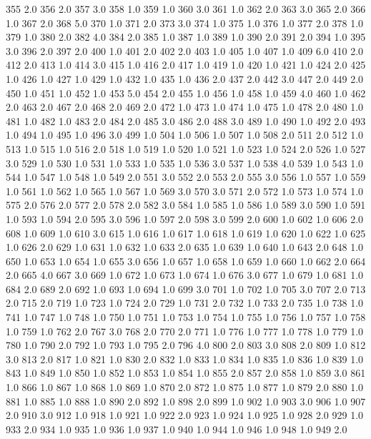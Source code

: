 355	2.0
356	2.0
357	3.0
358	1.0
359	1.0
360	3.0
361	1.0
362	2.0
363	3.0
365	2.0
366	1.0
367	2.0
368	5.0
370	1.0
371	2.0
373	3.0
374	1.0
375	1.0
376	1.0
377	2.0
378	1.0
379	1.0
380	2.0
382	4.0
384	2.0
385	1.0
387	1.0
389	1.0
390	2.0
391	2.0
394	1.0
395	3.0
396	2.0
397	2.0
400	1.0
401	2.0
402	2.0
403	1.0
405	1.0
407	1.0
409	6.0
410	2.0
412	2.0
413	1.0
414	3.0
415	1.0
416	2.0
417	1.0
419	1.0
420	1.0
421	1.0
424	2.0
425	1.0
426	1.0
427	1.0
429	1.0
432	1.0
435	1.0
436	2.0
437	2.0
442	3.0
447	2.0
449	2.0
450	1.0
451	1.0
452	1.0
453	5.0
454	2.0
455	1.0
456	1.0
458	1.0
459	4.0
460	1.0
462	2.0
463	2.0
467	2.0
468	2.0
469	2.0
472	1.0
473	1.0
474	1.0
475	1.0
478	2.0
480	1.0
481	1.0
482	1.0
483	2.0
484	2.0
485	3.0
486	2.0
488	3.0
489	1.0
490	1.0
492	2.0
493	1.0
494	1.0
495	1.0
496	3.0
499	1.0
504	1.0
506	1.0
507	1.0
508	2.0
511	2.0
512	1.0
513	1.0
515	1.0
516	2.0
518	1.0
519	1.0
520	1.0
521	1.0
523	1.0
524	2.0
526	1.0
527	3.0
529	1.0
530	1.0
531	1.0
533	1.0
535	1.0
536	3.0
537	1.0
538	4.0
539	1.0
543	1.0
544	1.0
547	1.0
548	1.0
549	2.0
551	3.0
552	2.0
553	2.0
555	3.0
556	1.0
557	1.0
559	1.0
561	1.0
562	1.0
565	1.0
567	1.0
569	3.0
570	3.0
571	2.0
572	1.0
573	1.0
574	1.0
575	2.0
576	2.0
577	2.0
578	2.0
582	3.0
584	1.0
585	1.0
586	1.0
589	3.0
590	1.0
591	1.0
593	1.0
594	2.0
595	3.0
596	1.0
597	2.0
598	3.0
599	2.0
600	1.0
602	1.0
606	2.0
608	1.0
609	1.0
610	3.0
615	1.0
616	1.0
617	1.0
618	1.0
619	1.0
620	1.0
622	1.0
625	1.0
626	2.0
629	1.0
631	1.0
632	1.0
633	2.0
635	1.0
639	1.0
640	1.0
643	2.0
648	1.0
650	1.0
653	1.0
654	1.0
655	3.0
656	1.0
657	1.0
658	1.0
659	1.0
660	1.0
662	2.0
664	2.0
665	4.0
667	3.0
669	1.0
672	1.0
673	1.0
674	1.0
676	3.0
677	1.0
679	1.0
681	1.0
684	2.0
689	2.0
692	1.0
693	1.0
694	1.0
699	3.0
701	1.0
702	1.0
705	3.0
707	2.0
713	2.0
715	2.0
719	1.0
723	1.0
724	2.0
729	1.0
731	2.0
732	1.0
733	2.0
735	1.0
738	1.0
741	1.0
747	1.0
748	1.0
750	1.0
751	1.0
753	1.0
754	1.0
755	1.0
756	1.0
757	1.0
758	1.0
759	1.0
762	2.0
767	3.0
768	2.0
770	2.0
771	1.0
776	1.0
777	1.0
778	1.0
779	1.0
780	1.0
790	2.0
792	1.0
793	1.0
795	2.0
796	4.0
800	2.0
803	3.0
808	2.0
809	1.0
812	3.0
813	2.0
817	1.0
821	1.0
830	2.0
832	1.0
833	1.0
834	1.0
835	1.0
836	1.0
839	1.0
843	1.0
849	1.0
850	1.0
852	1.0
853	1.0
854	1.0
855	2.0
857	2.0
858	1.0
859	3.0
861	1.0
866	1.0
867	1.0
868	1.0
869	1.0
870	2.0
872	1.0
875	1.0
877	1.0
879	2.0
880	1.0
881	1.0
885	1.0
888	1.0
890	2.0
892	1.0
898	2.0
899	1.0
902	1.0
903	3.0
906	1.0
907	2.0
910	3.0
912	1.0
918	1.0
921	1.0
922	2.0
923	1.0
924	1.0
925	1.0
928	2.0
929	1.0
933	2.0
934	1.0
935	1.0
936	1.0
937	1.0
940	1.0
944	1.0
946	1.0
948	1.0
949	2.0
